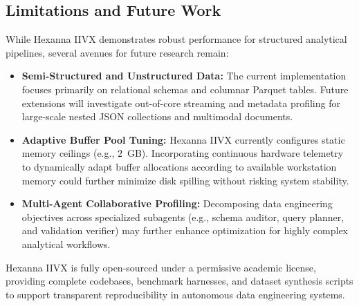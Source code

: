 \subsection{Limitations and Future Work}
While Hexanna IIVX demonstrates robust performance for structured analytical pipelines, several avenues for future research remain:
\begin{itemize}
    \item \textbf{Semi-Structured and Unstructured Data:} The current implementation focuses primarily on relational schemas and columnar Parquet tables. Future extensions will investigate out-of-core streaming and metadata profiling for large-scale nested JSON collections and multimodal documents.
    \item \textbf{Adaptive Buffer Pool Tuning:} Hexanna IIVX currently configures static memory ceilings (e.g., $2$~GB). Incorporating continuous hardware telemetry to dynamically adapt buffer allocations according to available workstation memory could further minimize disk spilling without risking system stability.
    \item \textbf{Multi-Agent Collaborative Profiling:} Decomposing data engineering objectives across specialized subagents (e.g., schema auditor, query planner, and validation verifier) may further enhance optimization for highly complex analytical workflows.
\end{itemize}

Hexanna IIVX is fully open-sourced under a permissive academic license, providing complete codebases, benchmark harnesses, and dataset synthesis scripts to support transparent reproducibility in autonomous data engineering systems.
